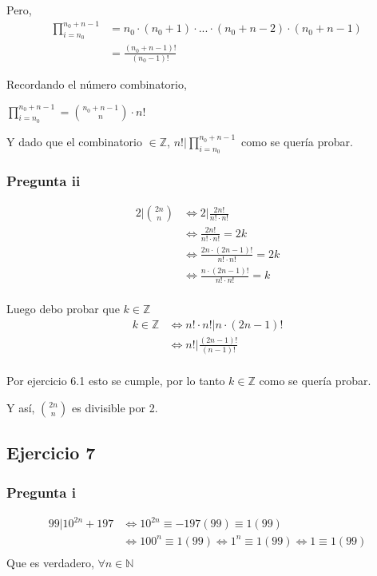 Pero,
\begin{align*}
    \prod_{i = n_0}^{n_0 + n - 1} &= n_0 \cdot (n_0 +1) \cdot ... \cdot (n_0 + n - 2) \cdot (n_0 + n -1) \\
    &= \frac{(n_0+n-1)!}{(n_0-1)!}
\end{align*}

Recordando el número combinatorio, 

$ \prod_{i = n_0}^{n_0 + n - 1} = \binom{n_0+n-1}{n} \cdot n! $

Y dado que el combinatorio $ \in \mathbb{Z} $, $ n! | \prod_{i = n_0}^{n_0 + n - 1} $ como se quería probar.

\subsubsection{Pregunta ii}
\begin{align*}
    2 | \binom{2n}{n} &\iff 2|\frac{2n!}{n!\cdot n!} \\
    &\iff \frac{2n!}{n!\cdot n!} = 2k \\
    &\iff \frac{2n \cdot (2n-1)!}{n!\cdot n!} = 2k \\
    &\iff \frac{n \cdot (2n-1)!}{n!\cdot n!} = k \\
\end{align*}

Luego debo probar que $k \in \mathbb{Z}$
\begin{align*}
    k \in \mathbb{Z} &\iff n!\cdot n! | n \cdot (2n-1)! \\
    &\iff n! | \frac{(2n-1)!}{(n-1)!} \\
\end{align*}

Por ejercicio 6.1 esto se cumple, por lo tanto $ k \in \mathbb{Z} $ como se quería probar.

Y así, $\binom{2n}{n}$ es divisible por 2.

\subsection{Ejercicio 7}
\subsubsection{Pregunta i}
\begin{align*}
    99 | 10^{2n} + 197 &\iff 10^{2n} \equiv -197(99) \equiv 1(99) \\
    &\iff 100^{n} \equiv 1(99) \iff 1^n \equiv 1(99) \iff 1 \equiv 1(99) \\
\end{align*}
Que es verdadero, $ \forall n \in \mathbb{N} $

